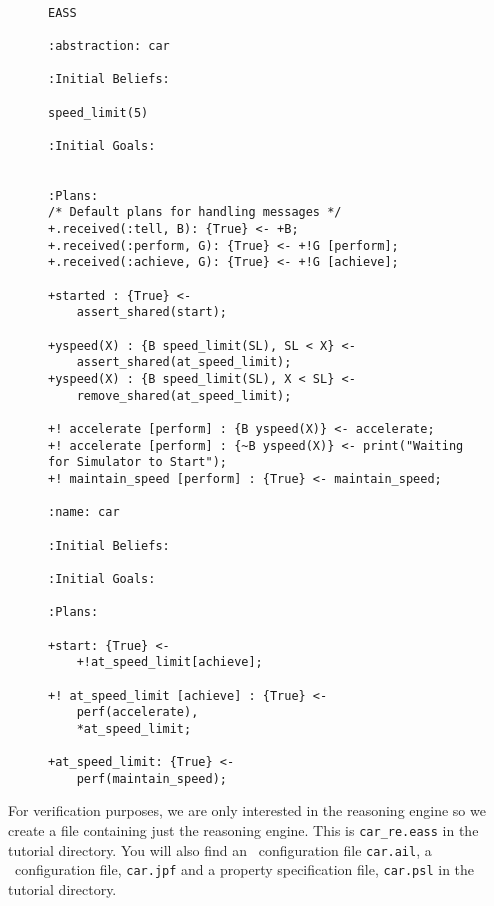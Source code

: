 \begin{figure}[!htbp]
\begin{ourexample}
\label{code:EASSverifexample} \quad \\
\begin{lstlisting}[basicstyle=\sffamily,style=easslisting,language=Gwendolen]
EASS

:abstraction: car

:Initial Beliefs:

speed_limit(5)
													
:Initial Goals:
		

:Plans: 
/* Default plans for handling messages */
+.received(:tell, B): {True} <- +B;   
+.received(:perform, G): {True} <- +!G [perform];
+.received(:achieve, G): {True} <- +!G [achieve];

+started : {True} <-
	assert_shared(start);

+yspeed(X) : {B speed_limit(SL), SL < X} <-
	assert_shared(at_speed_limit);
+yspeed(X) : {B speed_limit(SL), X < SL} <-
	remove_shared(at_speed_limit);
	
+! accelerate [perform] : {B yspeed(X)} <- accelerate;
+! accelerate [perform] : {~B yspeed(X)} <- print("Waiting for Simulator to Start");
+! maintain_speed [perform] : {True} <- maintain_speed;

:name: car
			
:Initial Beliefs:
													
:Initial Goals:
		
:Plans: 

+start: {True} <-
	+!at_speed_limit[achieve];

+! at_speed_limit [achieve] : {True} <-
	perf(accelerate),
	*at_speed_limit;

+at_speed_limit: {True} <-
	perf(maintain_speed);
\end{lstlisting} 
\end{ourexample}
\end{figure}

For verification purposes, we are only interested in the reasoning engine so we create a file containing just the reasoning engine.  This is \texttt{car\_re.eass} in the tutorial directory.  You will also find an \ail\ configuration file \texttt{car.ail}, a \jpf\ configuration file, \texttt{car.jpf} and a property specification file, \texttt{car.psl} in the tutorial directory.

